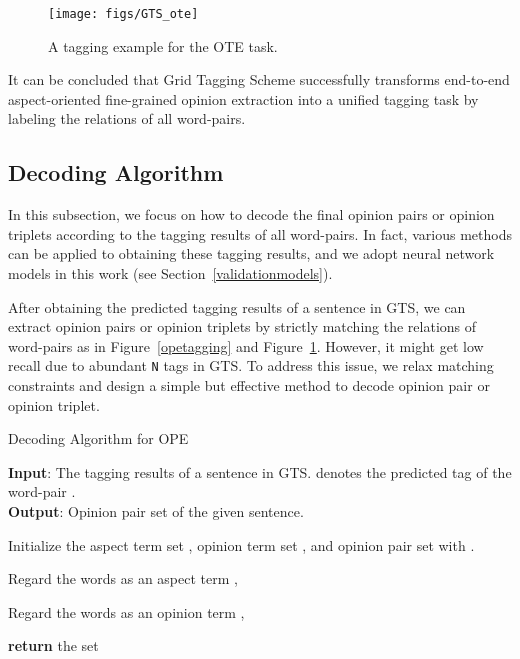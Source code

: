 \documentclass[11pt,a4paper]{article}
\begin{document}
\begin{figure}[h]
	\centering
	\texttt{[image: figs/GTS\_ote]}
	\caption{A tagging example for the OTE task.}
	\label{otetagging}
\end{figure} 

It can be concluded that Grid Tagging Scheme successfully transforms end-to-end aspect-oriented fine-grained opinion extraction into a unified tagging task by labeling the relations of all word-pairs.

\subsection{Decoding Algorithm}
In this subsection, we focus on how to decode the final opinion pairs or opinion triplets according to the tagging results of all word-pairs. In fact, various methods can be applied to obtaining these tagging results, and we adopt neural network models in this work (see Section~\ref{validationmodels}).

After obtaining the predicted tagging results of a sentence in GTS, we can extract opinion pairs or opinion triplets by strictly matching the relations of word-pairs as in Figure~\ref{opetagging} and Figure~\ref{otetagging}. However, it might get low recall due to abundant \texttt{N} tags in GTS. To address this issue, we relax matching constraints and design a simple but effective method to decode opinion pair or opinion triplet.

\begin{algorithm}[t]
	\small
	\caption{Decoding Algorithm for OPE}
	\label{alg:algorithm}
	\textbf{Input}: The tagging results  of a sentence in GTS.  denotes the predicted tag of the word-pair .\\
	\textbf{Output}: Opinion pair set  of the given sentence.
	\begin{algorithmic}[1] \STATE Initialize the aspect term set , opinion term set , and opinion pair set  with .
		
		\STATE Regard the words  as an aspect term , 
		
		\ENDIF
		\STATE Regard the words  as an opinion term , 
		\ENDIF
		
		\ENDWHILE
		
		
		\STATE 
		\ENDIF
		\ENDWHILE
		\ENDWHILE		
		\STATE \textbf{return} the set 
	\end{algorithmic}
	\label{opedecoding}
\end{algorithm}
\end{document}
